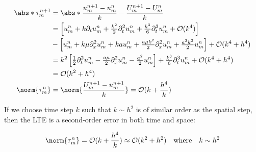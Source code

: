 \begin{align*}
  \abs*{\tau_m^{n+1}} & = \abs*{\dfrac{u_m^{n+1} - u_m^n}{k} - \dfrac{U_m^{n+1} - U_m^n}{k}} \\
                      & = \left[ u_m^n + k\partial_t u_m^n + \tfrac{k^2}{2}\partial_t^2 u_m^n + \tfrac{k^3}{6}\partial_t^3 u_m^n + \mathcal{O}(k^4) \right]                                      \\
                      & - \left[ u_m^n + k\mu\partial_{x}^2 u_m^n + kau_m^n + \tfrac{a\mu k^2}{2}\partial_{x}^2 u_m^n + \tfrac{a^2k^2}{2}u_m^n \right] + \mathcal{O}(k^4+h^4)                    \\
                      & = k^2 \left[\tfrac{1}{2}\partial_t^2 u_m^n - \tfrac{a \mu}{2}\partial_{x}^2 u_m^n - \tfrac{a^2}{2}u_m^n\right] + \tfrac{k^3}{6}\partial_t^3 u_m^n + \mathcal{O}(k^4+h^4) \\
                      & = \mathcal{O}(k^2 + h^4)                                                                                                                                                 \\
  \norm{\tau_m^n}     & = \norm{\frac{U_m^{n+1} - u_m^{n+1}}{k}} = \mathcal{O}(k + \frac{h^4}{k})                                                                                                \\
\end{align*}

If we choose time step \(k\) such that \(k \sim h^2\) is of similar order as the spatial step, then the LTE is a second-order error in both time and space:

\[
  \norm{\tau_m^n} = \mathcal{O}(k + \frac{h^4}{k}) \approx \mathcal{O}(k^2 + h^2) \quad \text{where} \quad k \sim h^2
\]

